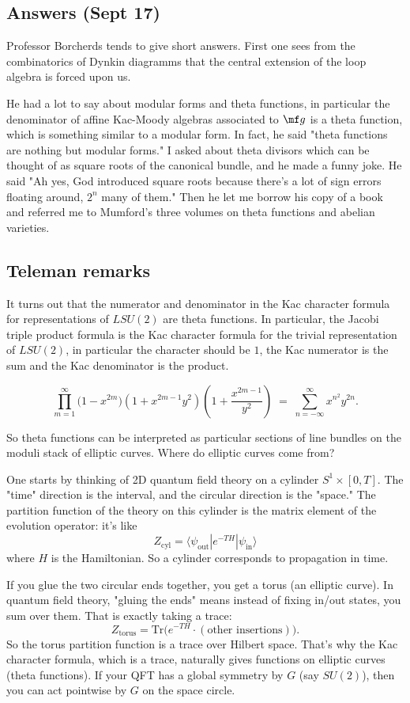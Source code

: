 \documentclass[12pt]{article}
\begin{document}
\subsection*{Answers (Sept 17)}
Professor Borcherds tends to give short answers. First one sees from the combinatorics of Dynkin diagramms that the central extension of the loop algebra is forced upon us.

He had a lot to say about modular forms and theta functions, in particular the denominator of affine Kac-Moody algebras associated to $\mf g$ is a theta function, which is something similar to a modular form. In fact, he said "theta functions are nothing but modular forms." I asked about theta divisors which can be thought of as square roots of the canonical bundle, and he made a funny joke. He said "Ah yes, God introduced square roots because there's a lot of sign errors floating around, $2^n$ many of them." Then he let me borrow his copy of a book and referred me to Mumford's three volumes on theta functions and abelian varieties.

\subsection*{Teleman remarks}
It turns out that the numerator and denominator in the Kac character formula for representations of $LSU(2)$ are theta functions. In particular, the Jacobi triple product formula is the Kac character formula for the trivial representation of $LSU(2)$, in particular the character should be $1$, the Kac numerator is the sum and the Kac denominator is the product.

\[
    \prod_{m=1}^\infty
    \bigl(1 - x^{2m}\bigr)
    \left(1 + x^{2m-1} y^2\right)
    \left(1 + \frac{x^{2m-1}}{y^2}\right)
    \;=\;
    \sum_{n=-\infty}^{\infty} x^{n^2} y^{2n}.
\]

So theta functions can be interpreted as particular sections of line bundles on the moduli stack of elliptic curves. Where do elliptic curves come from?

One starts by thinking of 2D quantum field theory on a cylinder $S^1 \times [0,T]$. The "time" direction is the interval, and the circular direction is the "space." The partition function of the theory on this cylinder is the matrix element of the evolution operator: it's like
\[
    Z_{\text{cyl}} = \langle \psi_{\text{out}} | e^{-T H} | \psi_{\text{in}} \rangle
\]
where $H$ is the Hamiltonian. So a cylinder corresponds to propagation in time.

If you glue the two circular ends together, you get a torus (an elliptic curve). In quantum field theory, "gluing the ends" means instead of fixing in/out states, you sum over them. That is exactly taking a trace:
\[
    Z_{\text{torus}} = \mathrm{Tr}\big( e^{-T H}\cdot(\text{other insertions})\big).
\]
So the torus partition function is a trace over Hilbert space. That's why the Kac character formula, which is a trace, naturally gives functions on elliptic curves (theta functions). If your QFT has a global symmetry by $G$ (say $SU(2)$), then you can act pointwise by $G$ on the space circle.
\end{document}
